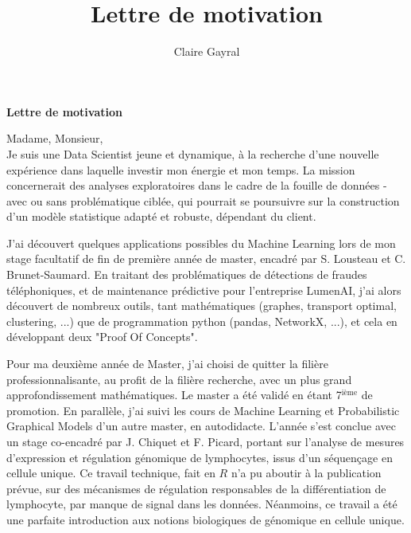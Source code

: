 \documentclass[a4paper,11pt]{article}
\title{Lettre de motivation}
\author{Claire Gayral}
\date{}
\begin{document}
{\centering \Large \bf Lettre de motivation \\ \vspace{1cm} }

Madame, Monsieur, 
\\

Je suis une Data Scientist jeune et dynamique, à la recherche d'une nouvelle expérience dans laquelle investir mon énergie et mon temps. La mission concernerait des analyses exploratoires dans le cadre de la fouille de données - avec ou sans problématique ciblée, qui pourrait se poursuivre sur la construction d'un modèle statistique adapté et robuste, dépendant du client. 

J'ai découvert quelques applications possibles du Machine Learning lors de mon stage facultatif de fin de première année de master, encadré par S. Lousteau et C. Brunet-Saumard.
En traitant des problématiques de détections de fraudes téléphoniques, et de maintenance prédictive pour l'entreprise LumenAI, j'ai alors découvert de nombreux outils, tant mathématiques (graphes, transport optimal, clustering, ...) que de programmation python (pandas, NetworkX, ...), et cela en développant deux "Proof Of Concepts".

Pour ma deuxième année de Master, j'ai choisi de quitter la filière professionnalisante, au profit de la filière recherche, avec un plus grand approfondissement mathématiques. Le master a été validé en étant 7$^{\text{ième}}$ de promotion. En parallèle, j'ai suivi les cours de Machine Learning et Probabilistic Graphical Models d'un autre master, en autodidacte. 
L'année s'est conclue avec un stage co-encadré par J. Chiquet et F. Picard, portant sur l'analyse de mesures d'expression et régulation génomique de lymphocytes, issus d'un séquençage en cellule unique. Ce travail technique, fait en $R$ n'a pu aboutir à la publication prévue, sur des mécanismes de régulation responsables de la différentiation de lymphocyte, par manque de signal dans les données. Néanmoins, ce travail a été une parfaite introduction aux notions biologiques de génomique en cellule unique.
%
%
\end{document}
